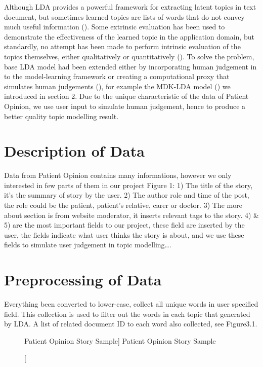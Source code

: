 \documentclass[11pt,twoside]{report}
\begin{document}
Although LDA provides a powerful framework for extracting latent topics in text document, but sometimes learned topics are lists of words that do not convey much useful information (\cite{ref26}). Some extrinsic evaluation has been used to demonstrate the effectiveness of the learned topic in the application domain, but standardly, no attempt has been made to perform intrinsic evaluation of the topics themselves, either qualitatively or quantitatively (\cite{ref27}). To solve the problem, base LDA model had been extended either by incorporating human judgement in to the model-learning framework or creating a computational proxy that simulates human judgements (\cite{ref28}), for example the MDK-LDA model (\cite{ref24}) we introduced in section 2.
Due to the unique characteristic of the data of Patient Opinion, we use user input to simulate human judgement, hence to produce a better quality topic modelling result.

\section{Description of Data}

Data from Patient Opinion contains many informations, however we only interested in few parts of them in our project Figure 1: 1) The title of the story, it’s the summary of story by the user. 2) The author role and time of the post, the role could be the patient, patient’s relative, carer or doctor. 3) The more about section is from website moderator, it inserts relevant tags to the story. 4) \& 5) are the most important fields to our project, these field are inserted by the user, the fields indicate what user thinks the story is about, and we use these fields to simulate user judgement in topic modelling….

\section{Preprocessing of Data}

Everything been converted to lower-case, collect all unique words in user specified field. This collection is used to filter out the words in each topic that generated by LDA. A list of related document ID to each word also collected, see Figure3.1.

\begin{figure}[tp]
    \begin{center}
    \caption
    [Patient Opinion Story Sample]
    {
    Patient Opinion Story Sample
    \label{Figure4}
    }
    \end{center}
\end{figure}
\end{document}
